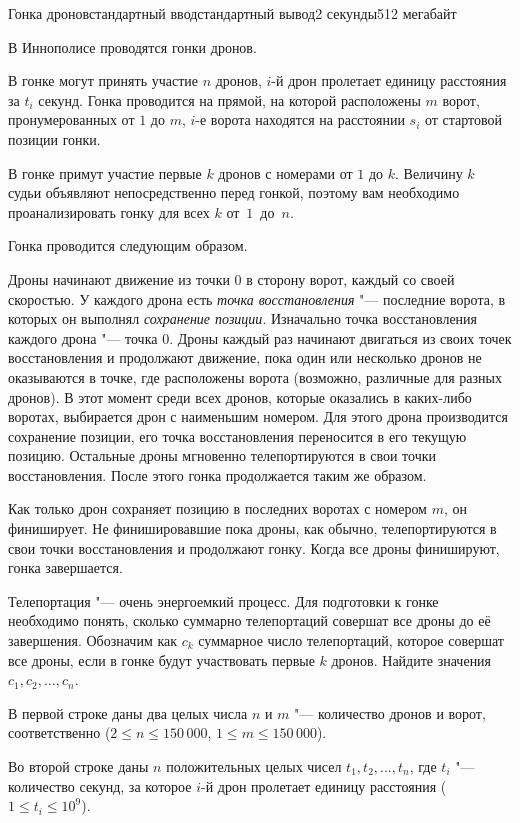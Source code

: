\begin{problem}{Гонка дронов}{стандартный ввод}{стандартный вывод}{2 секунды}{512 мегабайт}

В Иннополисе проводятся гонки дронов.

В гонке могут принять участие $n$ дронов, $i$-й дрон пролетает единицу расстояния за $t_i$ секунд.
Гонка проводится на прямой, на которой расположены $m$ ворот, пронумерованных от $1$ до $m$, $i$-е ворота находятся на расстоянии $s_i$ от стартовой позиции гонки.

В гонке примут участие первые $k$ дронов с номерами от $1$ до $k$. Величину $k$ судьи объявляют непосредственно перед гонкой, поэтому вам необходимо проанализировать гонку для всех $k$ от~$1$~до~$n$.

Гонка проводится следующим образом. 

Дроны начинают движение из точки $0$ в сторону ворот, каждый со своей скоростью. У каждого дрона есть \textit{точка восстановления} "--- последние ворота, в которых он выполнял \textit{сохранение позиции}. Изначально точка восстановления каждого дрона "--- точка $0$. Дроны каждый раз начинают двигаться из своих точек восстановления и продолжают движение, пока один или несколько дронов не оказываются в точке, где расположены ворота (возможно, различные для разных дронов). В этот момент среди всех дронов, которые оказались в каких-либо воротах, выбирается дрон с наименьшим номером. Для этого дрона производится сохранение позиции, его точка восстановления переносится в его текущую позицию. Остальные дроны мгновенно телепортируются в свои точки восстановления. После этого гонка продолжается таким же образом. 

Как только дрон сохраняет позицию в последних воротах с номером $m$, он финиширует. Не финишировавшие пока дроны, как обычно, телепортируются в свои точки восстановления и продолжают гонку. Когда все дроны финишируют, гонка завершается.

Телепортация "--- очень энергоемкий процесс. Для подготовки к гонке необходимо понять, сколько суммарно телепортаций совершат все дроны до её завершения. Обозначим как $c_k$ суммарное число телепортаций, которое совершат все дроны, если в гонке будут участвовать первые $k$ дронов. Найдите значения $c_1, c_2, \ldots, c_n$.

\InputFile
В первой строке даны два целых числа $n$ и $m$ "--- количество дронов и ворот, соответственно ($2 \le n \le 150\,000$, $1 \le m \le 150\,000$).

Во второй строке даны $n$ положительных целых чисел $t_1, t_2,...,t_n$, где $t_i$ "--- количество секунд, за которое $i$-й дрон пролетает единицу расстояния ($1 \le t_i \le 10^9$).


\end{problem}
